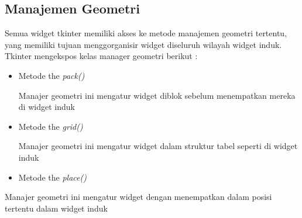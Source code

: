 \documentclass [12pt,a4paper,notitlepage,oneside,bahasa]{article}
\begin{document}
\begin{enumerate}
\begin{itemize}
\section{Manajemen Geometri}
\noindent 
 \hspace*{0.5in} Semua widget tkinter memiliki akses ke metode manajemen geometri tertentu, yang memiliki tujuan menggorganisir widget diseluruh wilayah widget induk. Tkinter mengekspos kelas manager geometri berikut : \par
\noindent 
\begin{itemize}
	\item Metode the \textit{pack()} \par
	\noindent 
	Manajer geometri ini mengatur widget diblok sebelum menempatkan mereka di widget induk \par
	\noindent 
	\item Metode the \textit{grid()} \par
	\noindent 
	Manajer geometri ini mengatur widget dalam struktur tabel seperti di widget induk \par
	\noindent 
	\item Metode the  \textit{place()}\end{itemize} \par
	\noindent 
	Manajer geometri ini mengatur widget dengan menempatkan dalam posisi tertentu dalam widget induk \par
	\vspace{12pt}
	\noindent 

\end{itemize}
\end{enumerate}
\end{document}
